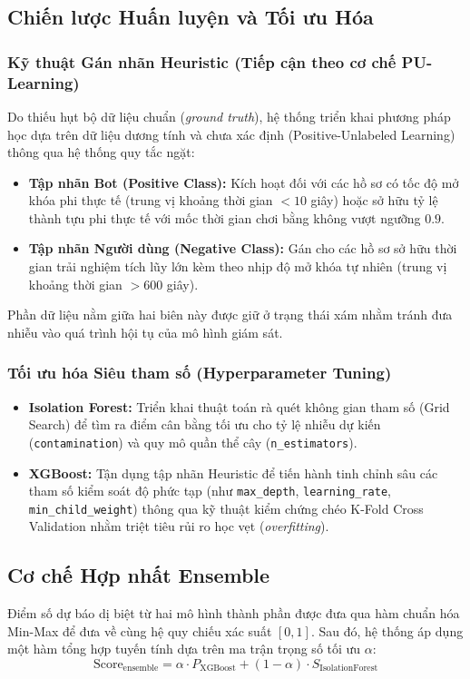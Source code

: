 \subsection{Chiến lược Huấn luyện và Tối ưu Hóa}

\subsubsection{Kỹ thuật Gán nhãn Heuristic (Tiếp cận theo cơ chế PU-Learning)}
Do thiếu hụt bộ dữ liệu chuẩn (\textit{ground truth}), hệ thống triển khai phương pháp học dựa trên dữ liệu dương tính và chưa xác định (Positive-Unlabeled Learning) thông qua hệ thống quy tắc ngặt:
\begin{itemize}
    \item \textbf{Tập nhãn Bot (Positive Class):} Kích hoạt đối với các hồ sơ có tốc độ mở khóa phi thực tế (trung vị khoảng thời gian $< 10$ giây) hoặc sở hữu tỷ lệ thành tựu phi thực tế với mốc thời gian chơi bằng không vượt ngưỡng $0.9$.
    \item \textbf{Tập nhãn Người dùng (Negative Class):} Gán cho các hồ sơ sở hữu thời gian trải nghiệm tích lũy lớn kèm theo nhịp độ mở khóa tự nhiên (trung vị khoảng thời gian $> 600$ giây).
\end{itemize}
Phần dữ liệu nằm giữa hai biên này được giữ ở trạng thái xám nhằm tránh đưa nhiễu vào quá trình hội tụ của mô hình giám sát.

\subsubsection{Tối ưu hóa Siêu tham số (Hyperparameter Tuning)}
\begin{itemize}
    \item \textbf{Isolation Forest:} Triển khai thuật toán rà quét không gian tham số (Grid Search) để tìm ra điểm cân bằng tối ưu cho tỷ lệ nhiễu dự kiến (\texttt{contamination}) và quy mô quần thể cây (\texttt{n\_estimators}).
    \item \textbf{XGBoost:} Tận dụng tập nhãn Heuristic để tiến hành tinh chỉnh sâu các tham số kiểm soát độ phức tạp (như \texttt{max\_depth}, \texttt{learning\_rate}, \texttt{min\_child\_weight}) thông qua kỹ thuật kiểm chứng chéo K-Fold Cross Validation nhằm triệt tiêu rủi ro học vẹt (\textit{overfitting}).
\end{itemize}

\subsection{Cơ chế Hợp nhất Ensemble}
Điểm số dự báo dị biệt từ hai mô hình thành phần được đưa qua hàm chuẩn hóa Min-Max để đưa về cùng hệ quy chiếu xác suất $[0, 1]$. Sau đó, hệ thống áp dụng một hàm tổng hợp tuyến tính dựa trên ma trận trọng số tối ưu $\alpha$:
$$\text{Score}_{\text{ensemble}} = \alpha \cdot P_{\text{XGBoost}} + (1 - \alpha) \cdot S_{\text{IsolationForest}}$$

